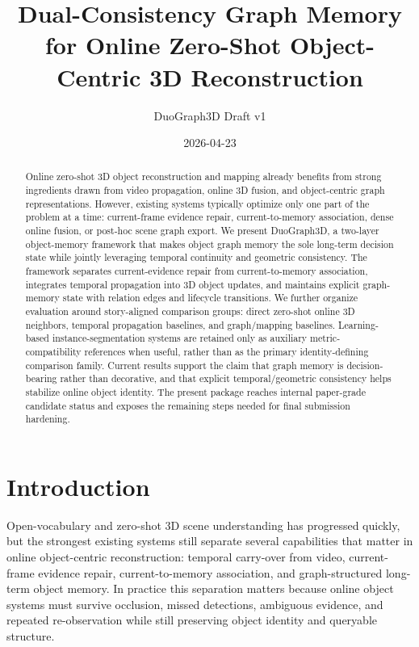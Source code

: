 \documentclass[11pt]{article}
\title{Dual-Consistency Graph Memory for Online Zero-Shot Object-Centric 3D Reconstruction}
\author{DuoGraph3D Draft v1}
\date{2026-04-23}
\begin{document}
\maketitle

\begin{abstract}
Online zero-shot 3D object reconstruction and mapping already benefits from strong ingredients drawn from video propagation, online 3D fusion, and object-centric graph representations. However, existing systems typically optimize only one part of the problem at a time: current-frame evidence repair, current-to-memory association, dense online fusion, or post-hoc scene graph export. We present DuoGraph3D, a two-layer object-memory framework that makes object graph memory the sole long-term decision state while jointly leveraging temporal continuity and geometric consistency. The framework separates current-evidence repair from current-to-memory association, integrates temporal propagation into 3D object updates, and maintains explicit graph-memory state with relation edges and lifecycle transitions. We further organize evaluation around story-aligned comparison groups: direct zero-shot online 3D neighbors, temporal propagation baselines, and graph/mapping baselines. Learning-based instance-segmentation systems are retained only as auxiliary metric-compatibility references when useful, rather than as the primary identity-defining comparison family. Current results support the claim that graph memory is decision-bearing rather than decorative, and that explicit temporal/geometric consistency helps stabilize online object identity. The present package reaches internal paper-grade candidate status and exposes the remaining steps needed for final submission hardening.
\end{abstract}

\section{Introduction}
Open-vocabulary and zero-shot 3D scene understanding has progressed quickly, but the strongest existing systems still separate several capabilities that matter in online object-centric reconstruction: temporal carry-over from video, current-frame evidence repair, current-to-memory association, and graph-structured long-term object memory. In practice this separation matters because online object systems must survive occlusion, missed detections, ambiguous evidence, and repeated re-observation while still preserving object identity and queryable structure.
\end{document}
